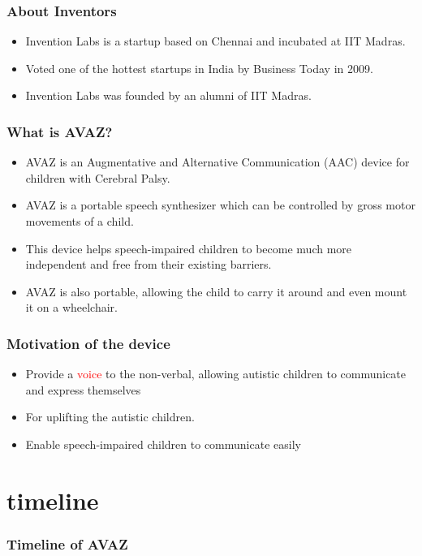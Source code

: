 \documentclass[12pt]{beamer}
\begin{document}
\begin{frame}
	\frametitle{About Inventors}
	\begin{itemize}
		\item Invention Labs is a startup based on Chennai and incubated at IIT Madras.
		\item Voted one of the hottest startups in India by Business Today in 2009.
		\item Invention Labs was founded by an alumni of IIT Madras.
	\end{itemize}
\end{frame}

\begin{frame}
	\frametitle{What is AVAZ?}
	\begin{itemize}
		\item AVAZ is an Augmentative and Alternative Communication (AAC) device for children with Cerebral Palsy.
		\item AVAZ is a portable speech synthesizer which can be controlled by gross motor movements of a child.
		\item This device helps speech-impaired children to become much more independent and free from their existing barriers.
		\item AVAZ is also portable, allowing the child to carry it around and even mount it on a wheelchair.
	\end{itemize}
\end{frame}

\begin{frame}
	\frametitle {Motivation of the device}
	\begin{itemize}
		\item Provide a \textcolor{red}{voice} to the non-verbal, allowing autistic children to communicate and express themselves
		\item For uplifting the autistic children.
		\item Enable speech-impaired children to communicate easily 
	\end{itemize}
\end{frame}

\section{timeline}
\begin{frame}
	\frametitle{Timeline of AVAZ}
\end{frame}
\end{document}
